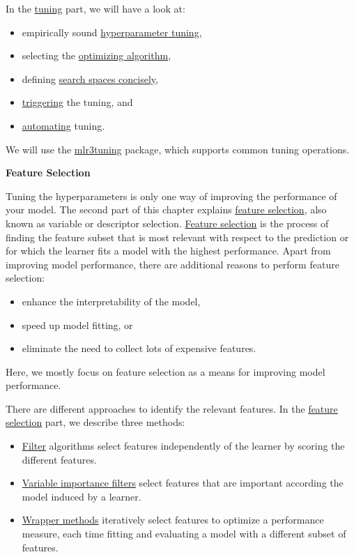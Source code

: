 \documentclass[
]{scrbook}
\providecommand{\tightlist}{%
  \setlength{\itemsep}{0pt}\setlength{\parskip}{0pt}}
\begin{document}
In the \protect\hyperlink{tuning}{tuning} part, we will have a look at:

\begin{itemize}
\tightlist
\item
  empirically sound \protect\hyperlink{tuning}{hyperparameter tuning},
\item
  selecting the \protect\hyperlink{tuning-optimization}{optimizing algorithm},
\item
  defining \protect\hyperlink{searchspace}{search spaces concisely},
\item
  \protect\hyperlink{tuning-triggering}{triggering} the tuning, and
\item
  \protect\hyperlink{autotuner}{automating} tuning.
\end{itemize}

We will use the \href{https://mlr3tuning.mlr-org.com}{mlr3tuning} package, which supports common tuning operations.

\textbf{Feature Selection}

Tuning the hyperparameters is only one way of improving the performance of your model.
The second part of this chapter explains \protect\hyperlink{fs}{feature selection}, also known as variable or descriptor selection.
\protect\hyperlink{fs}{Feature selection} is the process of finding the feature subset that is most relevant with respect to the prediction or for which the learner fits a model with the highest performance.
Apart from improving model performance, there are additional reasons to perform feature selection:

\begin{itemize}
\tightlist
\item
  enhance the interpretability of the model,
\item
  speed up model fitting, or
\item
  eliminate the need to collect lots of expensive features.
\end{itemize}

Here, we mostly focus on feature selection as a means for improving model performance.

There are different approaches to identify the relevant features.
In the \protect\hyperlink{fs}{feature selection} part, we describe three methods:

\begin{itemize}
\tightlist
\item
  \protect\hyperlink{fs-filter}{Filter} algorithms select features independently of the learner by scoring the different features.
\item
  \protect\hyperlink{fs-var-imp-filters}{Variable importance filters} select features that are important according the model induced by a learner.
\item
  \protect\hyperlink{fs-wrapper}{Wrapper methods} iteratively select features to optimize a performance measure, each time fitting and evaluating a model with a different subset of features.
\end{itemize}
\end{document}
